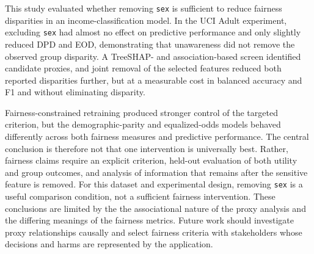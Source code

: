 \documentclass{article}
\begin{document}
This study evaluated whether removing \texttt{sex} is sufficient to reduce
fairness disparities in an income-classification model. In the UCI Adult
experiment, excluding \texttt{sex} had almost no effect on predictive
performance and only slightly reduced DPD and EOD, demonstrating that
unawareness did not remove the observed group disparity. A TreeSHAP- and
association-based screen identified candidate proxies, and joint removal of
the selected features reduced both reported disparities further, but at a
measurable cost in balanced accuracy and F1 and without eliminating disparity.

Fairness-constrained retraining produced stronger control of the targeted
criterion, but the demographic-parity and equalized-odds models behaved
differently across both fairness measures and predictive performance. The
central conclusion is therefore not that one intervention is universally
best. Rather, fairness claims require an explicit criterion, held-out
evaluation of both utility and group outcomes, and analysis of information that
remains after the sensitive feature is removed. For this dataset and
experimental design, removing \texttt{sex} is a useful comparison condition,
not a sufficient fairness intervention. These conclusions are limited by the
the associational nature of the proxy analysis and the differing meanings of
the fairness metrics. Future work should investigate proxy relationships
causally and select fairness criteria with stakeholders whose decisions and
harms are represented by the application.



\small






\end{document}
